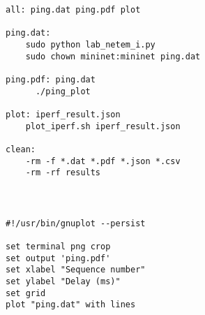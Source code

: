 \begin{verbatim}
all: ping.dat ping.pdf plot

ping.dat:
	sudo python lab_netem_i.py
	sudo chown mininet:mininet ping.dat

ping.pdf: ping.dat
	  ./ping_plot

plot: iperf_result.json
	plot_iperf.sh iperf_result.json

clean:
	-rm -f *.dat *.pdf *.json *.csv
	-rm -rf results
\end{verbatim}

\section*{}

\begin{verbatim}

#!/usr/bin/gnuplot --persist

set terminal png crop
set output 'ping.pdf'
set xlabel "Sequence number"
set ylabel "Delay (ms)"
set grid
plot "ping.dat" with lines

\end{verbatim}








